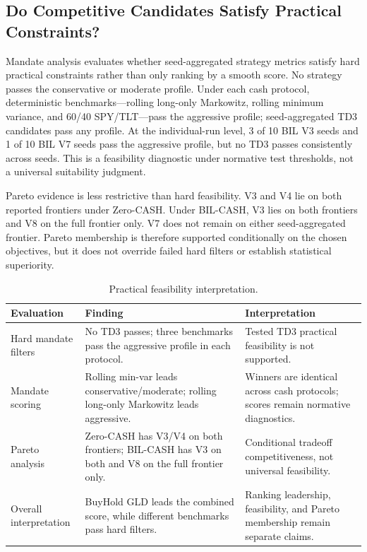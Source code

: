 \documentclass[11pt]{article}
\renewcommand{\arraystretch}{1.18}
\newcommand{\cashzero}{Zero-CASH}
\newcommand{\cashbil}{BIL-CASH}
\begin{document}
\subsection{Do Competitive Candidates Satisfy Practical Constraints?}

Mandate analysis evaluates whether seed-aggregated strategy metrics satisfy hard practical constraints rather than only ranking by a smooth score. No strategy passes the conservative or moderate profile. Under each cash protocol, \AggressiveFeasibleCount{} deterministic benchmarks---rolling long-only Markowitz, rolling minimum variance, and 60/40 SPY/TLT---pass the aggressive profile; \TDThreeFeasibleCount{} seed-aggregated TD3 candidates pass any profile. At the individual-run level, 3 of 10 BIL V3 seeds and 1 of 10 BIL V7 seeds pass the aggressive profile, but no TD3 passes consistently across seeds. This is a feasibility diagnostic under normative test thresholds, not a universal suitability judgment.

Pareto evidence is less restrictive than hard feasibility. V3 and V4 lie on both reported frontiers under \cashzero{}. Under \cashbil{}, V3 lies on both frontiers and V8 on the full frontier only. V7 does not remain on either seed-aggregated frontier. Pareto membership is therefore supported conditionally on the chosen objectives, but it does not override failed hard filters or establish statistical superiority.

\begin{table}[htbp]
\centering
\caption{Practical feasibility interpretation.}
\label{tab:practical-feasibility}
\footnotesize
\setlength{\tabcolsep}{5pt}
\renewcommand{\arraystretch}{1.22}
\begin{tabularx}{\textwidth}{@{}L{0.22\textwidth} L{0.36\textwidth} Y@{}}
\toprule
Evaluation & Finding & Interpretation \\
\midrule
Hard mandate filters & No TD3 passes; three benchmarks pass the aggressive profile in each protocol. & Tested TD3 practical feasibility is not supported. \\
Mandate scoring & Rolling min-var leads conservative/moderate; rolling long-only Markowitz leads aggressive. & Winners are identical across cash protocols; scores remain normative diagnostics. \\
Pareto analysis & Zero-CASH has V3/V4 on both frontiers; BIL-CASH has V3 on both and V8 on the full frontier only. & Conditional tradeoff competitiveness, not universal feasibility. \\
Overall interpretation & BuyHold GLD leads the combined score, while different benchmarks pass hard filters. & Ranking leadership, feasibility, and Pareto membership remain separate claims. \\
\bottomrule
\end{tabularx}
\end{table}
\end{document}
